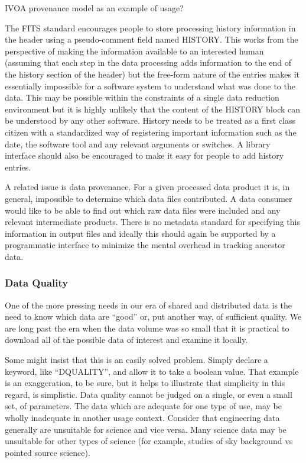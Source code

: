 \documentclass[final,authoryear,5p,times,twocolumn]{elsarticle}
\begin{document}
IVOA provenance model as an example of usage?


The FITS standard encourages people to store processing history
information in the header using a pseudo-comment field named
HISTORY. This works from the perspective of making the information
available to an interested human (assuming that each step in the data
processing adds information to the end of the history section of the
header) but the free-form nature of the entries makes it essentially
impossible for a software system to understand what was done to the
data. This may be possible within the constraints of a single data
reduction environment but it is highly unlikely that the content of
the HISTORY block can be understood by any other software. History
needs to be treated as a first class citizen with a standardized way
of registering important information such as the date, the software
tool and any relevant arguments or switches. A library interface
should also be encouraged to make it easy for people to add history
entries.


A related issue is data provenance. For a given processed data product
it is, in general, impossible to determine which data files
contributed. A data consumer would like to be able to find out which
raw data files were included and any relevant intermediate
products. There is no metadata standard for specifying this
information in output files and ideally this should again be supported
by a programmatic interface to minimize the mental overhead in
tracking ancestor data.


\subsubsection{Data Quality}


One of the more pressing needs in our era of shared and distributed
data is the need to know which data are ``good'' or, put another way, of
sufficient quality. We are long past the era when the data volume was
so small that it is practical to download all of the possible data of
interest and examine it locally.


Some might insist that this is an easily solved problem. Simply
declare a keyword, like ``DQUALITY'', and allow it to take a boolean
value. That example is an exaggeration, to be sure, but it helps to
illustrate that simplicity in this regard, is simplistic. Data quality
cannot be judged on a single, or even a small set, of parameters. The
data which are adequate for one type of use, may be wholly inadequate
in another usage context. Consider that engineering data generally are
unsuitable for science and vice versa. Many science data may be
unsuitable for other types of science (for example, studies of sky
background vs pointed source science).
\end{document}
